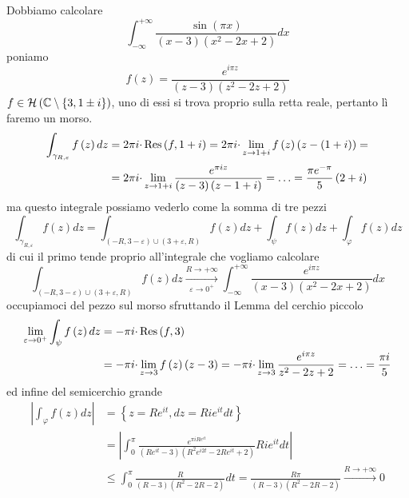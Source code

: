 Dobbiamo calcolare
\begin{equation*}
\int ^{+\infty }_{-\infty }\frac{\sin\left( \pi x\right)}{\left( x-3\right)\left( x^{2} -2x+2\right)} dx
\end{equation*}
poniamo
\begin{equation*}
f\left( z\right) =\frac{e^{i\pi z}}{\left( z-3\right)\left( z^{2} -2z+2\right)}
\end{equation*}
$f\in \mathcal{H} \left(\mathbb{C}  \setminus \left\{3,1\pm i\right\}\right)$, uno di essi si trova proprio sulla retta reale, pertanto lì faremo un morso.
\begin{align*}
\int _{\gamma _{R,\varepsilon }} f\left( z\right) dz & =2\pi i\cdotp \operatorname{Res} \left( f,1+i\right) =2\pi i\cdotp \lim _{z\rightarrow 1+i} f\left( z\right)\left( z-\left( 1+i\right)\right) =\\
 & =2\pi i\cdotp \lim _{z\rightarrow 1+i}\frac{e^{\pi iz}}{\left( z-3\right)\left( z-1+i\right)} =\dotsc =\frac{\pi e^{-\pi }}{5}\left( 2+i\right)
\end{align*}
ma questo integrale possiamo vederlo come la somma di tre pezzi
\begin{equation*}
\int _{\gamma _{R,\varepsilon }} f\left( z\right) dz=\int _{\left( -R,3-\varepsilon \right) \cup \left( 3+\varepsilon ,R\right)} f\left( z\right) dz+\int _{\psi } f\left( z\right) dz+\int _{\varphi } f\left( z\right) dz
\end{equation*}
di cui il primo tende proprio all'integrale che vogliamo calcolare
\begin{equation*}
\int _{\left( -R,3-\varepsilon \right) \cup \left( 3+\varepsilon ,R\right)} f\left( z\right) dz\xrightarrow[\varepsilon \rightarrow 0^{+}]{R\rightarrow +\infty }\int ^{+\infty }_{-\infty }\frac{e^{i\pi z}}{\left( x-3\right)\left( x^{2} -2x+2\right)} dx
\end{equation*}
occupiamoci del pezzo sul morso sfruttando il Lemma del cerchio piccolo
\begin{align*}
\lim _{\varepsilon \rightarrow 0^{+}}\int _{\psi } f\left( z\right) dz & =-\pi i\cdotp \operatorname{Res} \left( f,3\right)\\
 & =-\pi i\cdotp \lim _{z\rightarrow 3} f\left( z\right)\left( z-3\right) =-\pi i\cdotp \lim _{z\rightarrow 3}\frac{e^{i\pi z}}{z^{2} -2z+2} =\dotsc =\frac{\pi i}{5}
\end{align*}
ed infine del semicerchio grande
\begin{align*}
\left| \int _{\varphi } f\left( z\right) dz\right|  & =\left\{z=Re^{it} ,dz=Rie^{it} dt\right\}\\
 & =\left| \int ^{\pi }_{0}\frac{e^{\pi iRe^{it}}}{\left( Re^{it} -3\right)\left( R^{2} e^{i2t} -2Re^{it} +2\right)} Rie^{it} dt\right| \\
 & \leqslant \int ^{\pi }_{0}\frac{R}{\left( R-3\right)\left( R^{2} -2R-2\right)} dt=\frac{R\pi }{\left( R-3\right)\left( R^{2} -2R-2\right)}\xrightarrow{R\rightarrow +\infty } 0
\end{align*}
